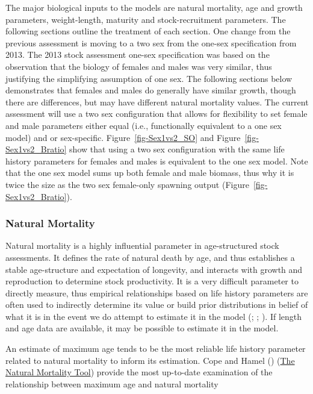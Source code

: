 \documentclass[
]{scrartcl}
\begin{document}
The major biological inputs to the models are natural mortality, age and
growth parameters, weight-length, maturity and stock-recruitment
parameters. The following sections outline the treatment of each
section. One change from the previous assessment is moving to a two sex
from the one-sex specification from 2013. The 2013 stock assessment
one-sex specification was based on the observation that the biology of
females and males was very similar, thus justifying the simplifying
assumption of one sex. The following sections below demonstrates that
females and males do generally have similar growth, though there are
differences, but may have different natural mortality values. The
current assessment will use a two sex configuration that allows for
flexibility to set female and male parameters either equal (i.e.,
functionally equivalent to a one sex model) and or sex-specific.
Figure~\ref{fig-Sex1vs2_SO} and Figure~\ref{fig-Sex1vs2_Bratio} show
that using a two sex configuration with the same life history parameters
for females and males is equivalent to the one sex model. Note that the
one sex model sums up both female and male biomass, thus why it is twice
the size as the two sex female-only spawning output
(Figure~\ref{fig-Sex1vs2_Bratio}).

\subsubsection{Natural Mortality}\label{natural-mortality}

Natural mortality is a highly influential parameter in age-structured
stock assessments. It defines the rate of natural death by age, and thus
establishes a stable age-structure and expectation of longevity, and
interacts with growth and reproduction to determine stock productivity.
It is a very difficult parameter to directly measure, thus empirical
relationships based on life history parameters are often used to
indirectly determine its value or build prior distributions in belief of
what it is in the event we do attempt to estimate it in the model
(;
;
). If length and
age data are available, it may be possible to estimate it in the model.

An estimate of maximum age tends to be the most reliable life history
parameter related to natural mortality to inform its estimation. Cope
and Hamel ()
(\href{https://connect.fisheries.noaa.gov/natural-mortality-tool/}{The
Natural Mortality Tool}) provide the most up-to-date examination of the
relationship between maximum age and natural mortality
\end{document}
